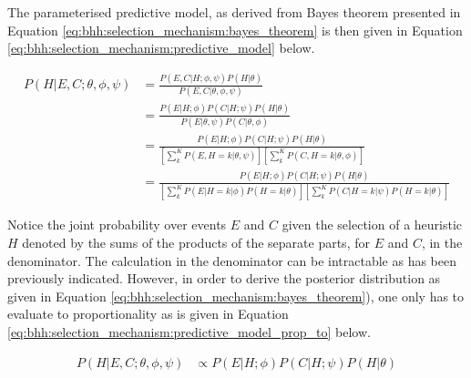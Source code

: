 The parameterised predictive model, as derived from Bayes theorem presented in Equation \ref{eq:bhh:selection_mechanism:bayes_theorem} is then given in Equation \ref{eq:bhh:selection_mechanism:predictive_model} below.

\begin{equation}
    \label{eq:bhh:selection_mechanism:predictive_model}
    \begin{split}
        P(H \vert E, C;  \theta, \phi, \psi)
        &= \frac{
            P(E, C \vert H;  \phi, \psi)  P(H \vert \theta)
            }{
            P(E, C \vert \theta, \phi, \psi)
        } \\		
        &= \frac{
            P(E \vert H;  \phi)  P(C \vert H;  \psi) P(H \vert \theta)
            }{
            P(E \vert \theta, \psi) P(C \vert \theta, \phi)
        } \\
        &= \frac{
            P(E \vert H;  \phi)  P(C \vert H;  \psi) P(H \vert \theta)
            }{
            \left[ \sum_{k}^{K} P(E, H=k \vert \theta, \psi) \right] \left[ \sum_{k}^{K}  P(C, H=k \vert \theta, \phi) \right]
        } \\
        &= \frac{
            P(E \vert H;  \phi)  P(C \vert H;  \psi) P(H \vert \theta)
            }{
            \left[ \sum_{k}^{K} P(E \vert H=k \vert \phi) P(H=k \vert \theta) \right] \left[ \sum_{k}^{K} P(C \vert H=k \vert \psi) P(H=k \vert \theta) \right]
        }
    \end{split}
\end{equation}

Notice the joint probability over events $E$ and $C$ given the selection of a heuristic $H$ denoted by the sums of the products of the separate parts, for $E$ and $C$, in the denominator. The calculation in the denominator can be intractable as has been previously indicated. However, in order to derive the posterior distribution as given in Equation \ref{eq:bhh:selection_mechanism:bayes_theorem}), one only has to evaluate to proportionality as is given in Equation \ref{eq:bhh:selection_mechanism:predictive_model_prop_to} below.

\begin{equation}
    \label{eq:bhh:selection_mechanism:predictive_model_prop_to}
    \begin{split}
        P(H \vert E, C;  \theta, \phi, \psi) &\propto P(E \vert H;  \phi)  P(C \vert H;  \psi) P(H \vert \theta)
    \end{split}
\end{equation}

